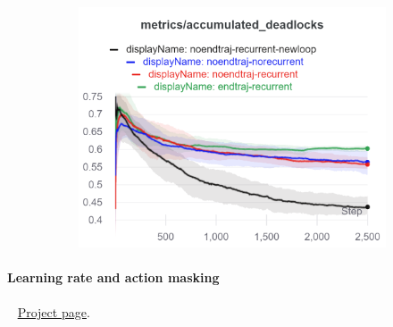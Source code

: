 \documentclass[11pt, a4paper, hidelinks]{report}
\begin{document}
\begin{figure}
\begin{subfigure}{\linewidth}
		\includegraphics[width=0.33\linewidth]{resources/charts_psppo_2/accumulated_deadlocks}
	\end{subfigure}\par\medskip
	\caption{}
	\label{fig:psppo_training_rec_loop}
\end{figure}

\paragraph{Learning rate and action masking}\label{par:learning_rate_action_masking}
~\newline
\href{https://wandb.ai/fiorenzoparascandolo/flatland-challenge-final}{Project page}.\\
\end{document}
